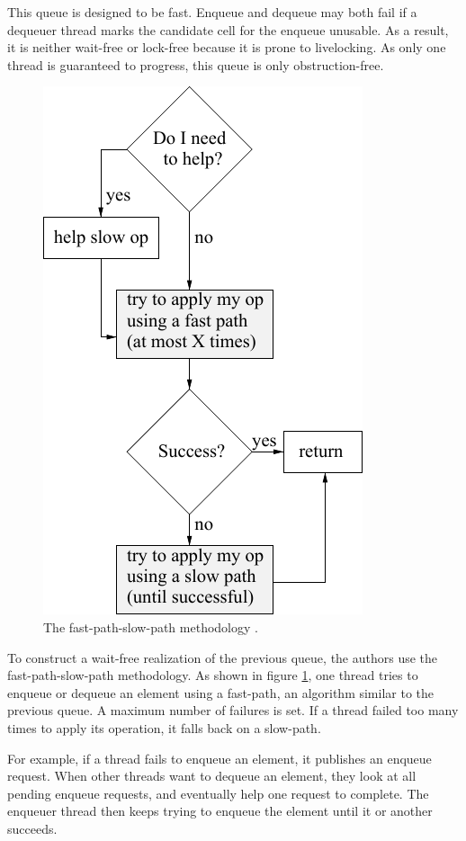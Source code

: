 This queue is designed to be fast. Enqueue and dequeue may both fail if a
dequeuer thread marks the candidate cell for the enqueue unusable. As a result,
it is neither wait-free or lock-free because it is prone to livelocking. As only
one thread is guaranteed to progress, this queue is only obstruction-free.
\medskip

\begin{figure}
    \caption{The fast-path-slow-path methodology \cite{Kogan:2012:MCF:2370036.2145835}.}
    \label{fig:fpsp}
    \center
    \includegraphics[width=0.6\linewidth]{img/fpsp.pdf}
\end{figure}

 To construct a wait-free realization of the previous
queue, the authors use the fast-path-slow-path methodology. As shown in figure
\ref{fig:fpsp}, one thread tries to enqueue or dequeue an element using a
fast-path, an algorithm similar to the previous queue. A maximum number of
failures is set. If a thread failed too many times to apply its operation, it
falls back on a slow-path.

For example, if a thread fails to enqueue an element, it publishes an enqueue
request. When other threads want to dequeue an element, they look at all pending
enqueue requests, and eventually help one request to complete. The enqueuer
thread then keeps trying to enqueue the element until it or another succeeds.

